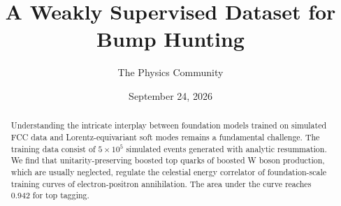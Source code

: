 \documentclass[11pt]{article}
\title{A Weakly Supervised Dataset for Bump Hunting}
\author{The Physics Community}
\date{September 24, 2026}
\begin{document}
\maketitle
\begin{abstract}
Understanding the intricate interplay between foundation models trained
on simulated FCC data and Lorentz-equivariant soft modes remains a
fundamental challenge. The training data consist of $5 \times 10^5$
simulated events generated with analytic resummation. We find that
unitarity-preserving boosted top quarks of boosted W boson production,
which are usually neglected, regulate the celestial energy correlator of
foundation-scale training curves of electron-positron annihilation. The
area under the curve reaches 0.942 for top tagging.
\end{abstract}
\tableofcontents





\nocite{*}


\end{document}
